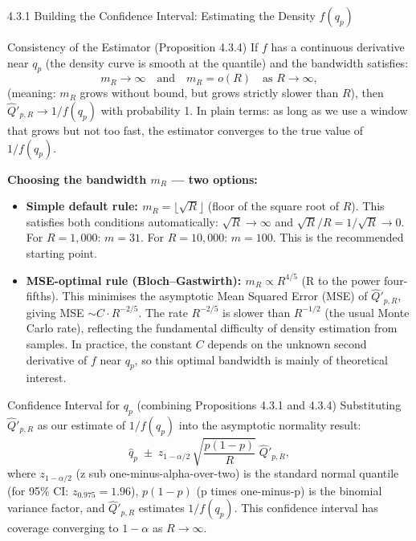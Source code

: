 \documentclass[aspectratio=169,10pt]{beamer}
\begin{document}
\begin{frame}[allowframebreaks]{4.3.1 Building the Confidence Interval: Estimating the Density $f(q_p)$}
\framebreak

\begin{block}{Consistency of the Estimator (Proposition 4.3.4)}
  If $f$ has a continuous derivative near $q_p$ (the density curve is smooth
  at the quantile) and the bandwidth satisfies:
  \[
    m_R \to \infty \quad \text{and} \quad m_R = o(R) \quad \text{as } R \to \infty,
  \]
  (meaning: $m_R$ grows without bound, but grows strictly slower than $R$),
  then $\hat{Q}'_{p,R} \to 1/f(q_p)$ with probability 1.
  In plain terms: as long as we use a window that grows but not too fast, the
  estimator converges to the true value of $1/f(q_p)$.
\end{block}

\textbf{Choosing the bandwidth $m_R$ --- two options:}

\begin{itemize}
  \item \textbf{Simple default rule: $m_R = \lfloor\sqrt{R}\rfloor$} (floor of the
    square root of $R$).  This satisfies both conditions automatically: $\sqrt{R} \to \infty$
    and $\sqrt{R}/R = 1/\sqrt{R} \to 0$.  For $R = 1{,}000$: $m = 31$.
    For $R = 10{,}000$: $m = 100$.  This is the recommended starting point.
  \item \textbf{MSE-optimal rule (Bloch--Gastwirth): $m_R \propto R^{4/5}$} (R to the
    power four-fifths).  This minimises the asymptotic Mean Squared Error (MSE)
    of $\hat{Q}'_{p,R}$, giving MSE $\sim C \cdot R^{-2/5}$.  The rate $R^{-2/5}$
    is slower than $R^{-1/2}$ (the usual Monte Carlo rate), reflecting the
    fundamental difficulty of density estimation from samples.  In practice, the
    constant $C$ depends on the unknown second derivative of $f$ near $q_p$, so
    this optimal bandwidth is mainly of theoretical interest.
\end{itemize}

\begin{block}{Confidence Interval for $q_p$ (combining Propositions 4.3.1 and 4.3.4)}
  Substituting $\hat{Q}'_{p,R}$ as our estimate of $1/f(q_p)$ into the asymptotic
  normality result:
  \[
    \hat{q}_p \;\pm\; z_{1-\alpha/2}\,\sqrt{\frac{p(1-p)}{R}}\;\hat{Q}'_{p,R},
  \]
  where $z_{1-\alpha/2}$ (z sub one-minus-alpha-over-two) is the standard normal
  quantile (for 95\% CI: $z_{0.975} = 1.96$), $p(1-p)$ (p times one-minus-p) is
  the binomial variance factor, and $\hat{Q}'_{p,R}$ estimates $1/f(q_p)$.
  This confidence interval has coverage converging to $1-\alpha$ as $R \to \infty$.
\end{block}


\end{frame}
\end{document}
